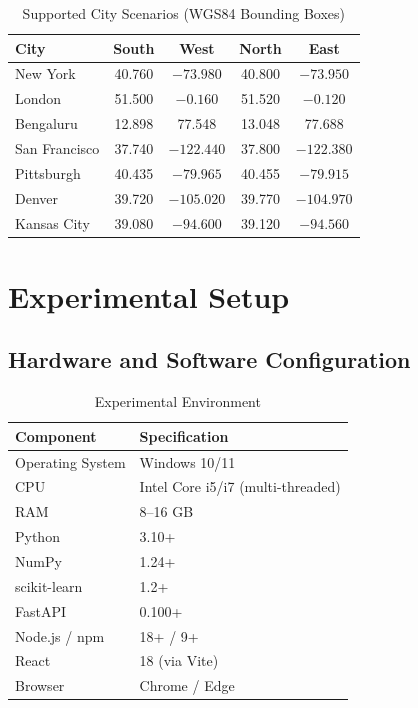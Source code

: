 \documentclass[10pt,conference]{IEEEtran}
\begin{document}
\begin{table}[h]
\caption{Supported City Scenarios (WGS84 Bounding Boxes)}
\label{tab:scenarios}
\begin{center}
\footnotesize
\begin{tabular}{|l|c|c|c|c|}
\hline
\textbf{City} & \textbf{South} & \textbf{West} & \textbf{North} & \textbf{East} \\
\hline
New York & 40.760 & $-73.980$ & 40.800 & $-73.950$ \\
London & 51.500 & $-0.160$ & 51.520 & $-0.120$ \\
Bengaluru & 12.898 & 77.548 & 13.048 & 77.688 \\
San Francisco & 37.740 & $-122.440$ & 37.800 & $-122.380$ \\
Pittsburgh & 40.435 & $-79.965$ & 40.455 & $-79.915$ \\
Denver & 39.720 & $-105.020$ & 39.770 & $-104.970$ \\
Kansas City & 39.080 & $-94.600$ & 39.120 & $-94.560$ \\
\hline
\end{tabular}
\end{center}
\end{table}

\section{Experimental Setup}

\subsection{Hardware and Software Configuration}

\begin{table}[h]
\caption{Experimental Environment}
\label{tab:hw_config}
\begin{center}
\begin{tabular}{|l|l|}
\hline
\textbf{Component} & \textbf{Specification} \\
\hline
Operating System & Windows 10/11 \\
CPU & Intel Core i5/i7 (multi-threaded) \\
RAM & 8--16 GB \\
Python & 3.10+ \\
NumPy & 1.24+ \\
scikit-learn & 1.2+ \\
FastAPI & 0.100+ \\
Node.js / npm & 18+ / 9+ \\
React & 18 (via Vite) \\
Browser & Chrome / Edge \\
\hline
\end{tabular}
\end{center}
\end{table}
\end{document}
